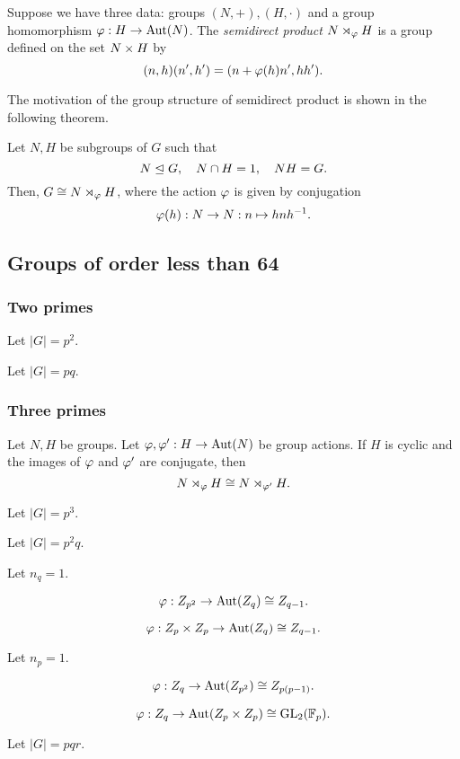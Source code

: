 \documentclass{../exp}
\begin{document}
\begin{defn}
Suppose we have three data: groups $(N,+),(H,\cdot)$ and a group homomorphism $\f:H\to\Aut(N)$.
The \emph{semidirect product} $N\rtimes_\varphi H$ is a group defined on the set $N\times H$ by
\[(n,h)(n',h')=(n+\varphi(h)n',hh').\]
\end{defn}
The motivation of the group structure of semidirect product is shown in the following theorem.
\begin{thm}
Let $N,H$ be subgroups of $G$ such that
\[N\trianglelefteq G,\quad N\cap H=1,\quad NH=G.\]
Then, $G\cong N\rtimes_\varphi H$, where the action $\varphi$ is given by conjugation
\[\f(h):N\to N:n\mapsto hnh^{-1}.\]
\end{thm}




\subsection{Groups of order less than 64}


\subsubsection{Two primes}
\begin{ex}
Let $|G|=p^2$.
\end{ex}

\begin{ex}
Let $|G|=pq$.
\end{ex}




\subsubsection{Three primes}
\begin{lem}
Let $N,H$ be groups.
Let $\f,\f':H\to\Aut(N)$ be group actions.
If $H$ is cyclic and the images of $\varphi$ and $\varphi'$ are conjugate, then
\[N\rtimes_\varphi H\cong N\rtimes_{\varphi'}H.\]
\end{lem}


\begin{ex}
Let $|G|=p^3$.
\end{ex}
\begin{ex}
Let $|G|=p^2q$.

Let $n_q=1$.
\begin{cond}
\item \[\f:Z_{p^2}\to\Aut(Z_q)\cong Z_{q-1}.\]
\item \[\f:Z_p\x Z_p\to\Aut(Z_q)\cong Z_{q-1}.\]
\end{cond}

Let $n_p=1$.
\begin{cond}
\item \[\f:Z_q\to\Aut(Z_{p^2})\cong Z_{p(p-1)}.\]
\item \[\f:Z_q\to\Aut(Z_p\x Z_p)\cong\GL_2(\F_p).\]
\end{cond}
\end{ex}
\begin{ex}
Let $|G|=pqr$.
\end{ex}
\end{document}

